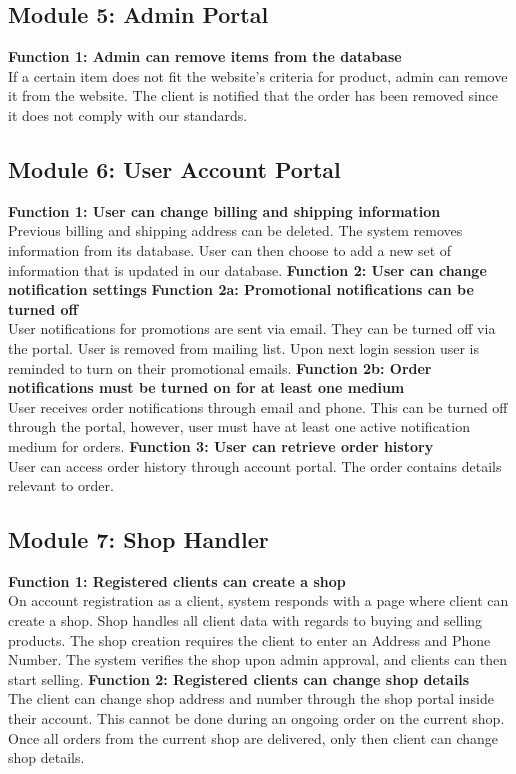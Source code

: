\subsection*{Module 5: Admin Portal}
\begin{outline}
    \1 \textbf{Function 1: Admin can remove items from the database} \\
    If a certain item does not fit the website's criteria for product, admin can remove it from the website. The client is notified that the order has been removed since it does not comply with our standards.
\end{outline}
\subsection*{Module 6: User Account Portal}
\begin{outline}
    \1 \textbf{Function 1: User can change billing and shipping information} \\
    Previous billing and shipping address can be deleted. The system removes information from its database. User can then choose to add a new set of information that is updated in our database.
    \1 \textbf{Function 2: User can change notification settings}
        \2 \textbf{Function 2a: Promotional notifications can be turned off} \\
        User notifications for promotions are sent via email. They can be turned off via the portal. User is removed from mailing list. Upon next login session user is reminded to turn on their promotional emails.
        \2 \textbf{Function 2b: Order notifications must be turned on for at least one medium} \\
        User receives order notifications through email and phone. This can be turned off through the portal, however, user must have at least one active notification medium for orders.
    \1 \textbf{Function 3: User can retrieve order history} \\
    User can access order history through account portal. The order contains details relevant to order.
\end{outline}

\subsection*{Module 7: Shop Handler}
\begin{outline}
    \1 \textbf{Function 1: Registered clients can create a shop} \\
    On account registration as a client, system responds with a page where client can create a shop. Shop handles all client data with regards to buying and selling products. The shop creation requires the client to enter an Address and Phone Number. The system verifies the shop upon admin approval, and clients can then start selling.
    \1 \textbf{Function 2: Registered clients can change shop details} \\
    The client can change shop address and number through the shop portal inside their account. This cannot be done during an ongoing order on the current shop. Once all orders from the current shop are delivered, only then client can change shop details.
\end{outline}


